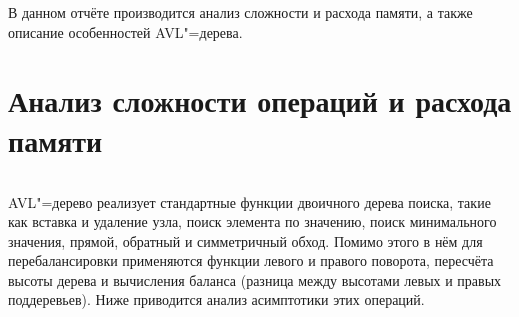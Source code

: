 \documentclass[otchet]{../SCWorks}
\begin{document}

\date{2026}

\maketitle

\secNumbering

\tableofcontents




\intro
В данном отчёте производится анализ сложности и расхода памяти, а также описание особенностей AVL"=дерева.

\section{Анализ сложности операций и расхода памяти}

\small
\inputminted[breaklines]{cpp}{./avl_tree.cpp}
\normalsize

AVL"=дерево реализует стандартные функции двоичного дерева поиска, такие как вставка и удаление узла, поиск элемента по значению, поиск минимального значения, прямой, обратный и симметричный обход. Помимо этого в нём для перебалансировки применяются функции левого и правого поворота, пересчёта высоты дерева и вычисления баланса (разница между высотами левых и правых поддеревьев). Ниже приводится анализ асимптотики этих операций.
\end{document}
